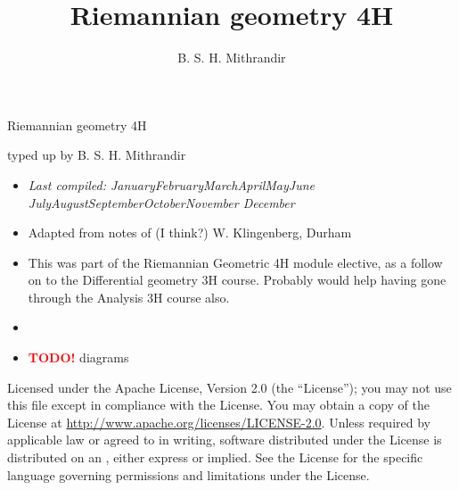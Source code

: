 \documentclass[letter-paper]{tufte-book}
\title{Riemannian geometry 4H}
\author[]{B. S. H. Mithrandir}
\newcommand{\monthyear}{%
  \ifcase\month\or January\or February\or March\or April\or May\or June\or
  July\or August\or September\or October\or November\or
  December\fi\space\number\year
}
\newcommand{\TODO}{\textcolor{red}{\bf TODO!}\xspace}
\begin{document}



\chapter*{}

\begin{fullwidth}

\par \begin{center}{\Huge Riemannian geometry 4H}\end{center}

\vspace*{5mm}

\par \begin{center}{\Large typed up by B. S. H. Mithrandir}\end{center}

\vspace*{5mm}

\begin{itemize}
  \item \textit{Last compiled: \monthyear}
  \item Adapted from notes of (I think?) W. Klingenberg, Durham
  \item This was part of the Riemannian Geometric 4H module elective, as a follow on to the Differential geometry 3H course. Probably would help having gone through the Analysis 3H course also.
  \item[]
  \item \TODO diagrams
\end{itemize}

\par

\par Licensed under the Apache License, Version 2.0 (the ``License''); you may not
use this file except in compliance with the License. You may obtain a copy
of the License at \url{http://www.apache.org/licenses/LICENSE-2.0}. Unless
required by applicable law or agreed to in writing, software distributed
under the License is distributed on an , either express or implied. See the
License for the specific language governing permissions and limitations
under the License.
\end{fullwidth}
\end{document}

